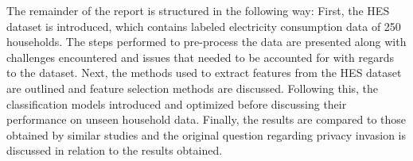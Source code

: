 The remainder of the report is structured in the following way: First, the HES dataset is introduced, which contains labeled electricity consumption data of 250 households. The steps performed to pre-process the data are presented along with challenges encountered and issues that needed to be accounted for with regards to the dataset. Next, the methods used to extract features from the HES dataset are outlined and feature selection methods are discussed. Following this, the classification models introduced and optimized before discussing their performance on unseen household data. Finally, the results are compared to those obtained by similar studies and the original question regarding privacy invasion is discussed in relation to the results obtained.
